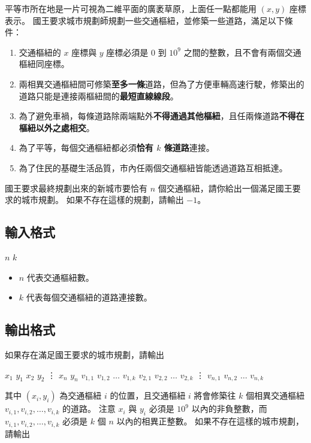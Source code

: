 平等市所在地是一片可視為二維平面的廣袤草原，上面任一點都能用 \((x, y)\)
座標表示。
國王要求城市規劃師規劃一些交通樞紐，並修築一些道路，滿足以下條件：

\begin{enumerate}
\def\labelenumi{\arabic{enumi}.}
\tightlist
\item
  交通樞紐的 \(x\) 座標與 \(y\) 座標必須是 \(0\) 到 \(10^9\)
  之間的整數，且不會有兩個交通樞紐同座標。
\item
  兩相異交通樞紐間可修築\textbf{至多一條}道路，但為了方便車輛高速行駛，修築出的道路只能是連接兩樞紐間的\textbf{最短直線線段}。
\item
  為了避免車禍，每條道路除兩端點外\textbf{不得通過其他樞紐}，且任兩條道路\textbf{不得在樞紐以外之處相交}。
\item
  為了平等，每個交通樞紐都必須\textbf{恰有 \(k\) 條道路}連接。
\item
  為了住民的基礎生活品質，市內任兩個交通樞紐皆能透過道路互相抵達。
\end{enumerate}

國王要求最終規劃出來的新城市要恰有 \(n\)
個交通樞紐，請你給出一個滿足國王要求的城市規劃。
如果不存在這樣的規劃，請輸出 \(-1\)。

\subsection{輸入格式}

\begin{format}
\f{
$n$ $k$
}
\end{format}

\begin{itemize}
\tightlist
\item
  \(n\) 代表交通樞紐數。
\item
  \(k\) 代表每個交通樞紐的道路連接數。
\end{itemize}

\subsection{輸出格式}

如果存在滿足國王要求的城市規劃，請輸出

\begin{format}
\f{
$x_1$ $y_1$
$x_2$ $y_2$
\vdots
$x_n$ $y_n$
$v_{1, 1}$ $v_{1, 2}$ $\ldots$ $v_{1, k}$
$v_{2, 1}$ $v_{2, 2}$ $\ldots$ $v_{2, k}$
\vdots
$v_{n, 1}$ $v_{n, 2}$ $\ldots$ $v_{n, k}$
}
\end{format}

其中 \((x_i, y_i)\) 為交通樞紐 \(i\) 的位置，且交通樞紐 \(i\) 將會修築往
\(k\) 個相異交通樞紐 \(v_{i, 1}, v_{i, 2}, \ldots, v_{i, k}\) 的道路。
注意 \(x_i\) 與 \(y_i\) 必須是 \(10^9\) 以內的非負整數，而
\(v_{i, 1}, v_{i, 2}, \ldots, v_{i, k}\) 必須是 \(k\) 個 \(n\)
以內的相異正整數。 如果不存在這樣的城市規劃，請輸出

